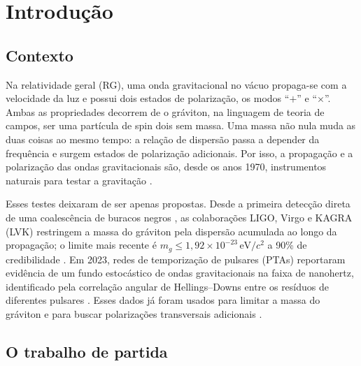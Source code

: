 \chapter{Introdução}
\label{cap:introducao}

\section{Contexto}

Na relatividade geral (RG), uma onda gravitacional no vácuo propaga-se
com a velocidade da luz e possui dois estados de polarização, os modos
``$+$'' e ``$\times$''. Ambas as propriedades decorrem de o gráviton,
na linguagem de teoria de campos, ser uma partícula de spin dois sem
massa. Uma massa não nula muda as duas coisas ao mesmo tempo: a relação
de dispersão passa a depender da frequência e surgem estados de
polarização adicionais. Por isso, a propagação e a polarização das ondas
gravitacionais são, desde os anos 1970, instrumentos naturais para testar
a gravitação \autocite{eardley1973,will2014}.

Esses testes deixaram de ser apenas propostas. Desde a primeira detecção
direta de uma coalescência de buracos negros \autocite{gw150914}, as
colaborações LIGO, Virgo e KAGRA (LVK) restringem a massa do gráviton
pela dispersão acumulada ao longo da propagação; o limite mais recente
é $m_g\leq1{,}92\times10^{-23}\,\mathrm{eV}/c^2$ a 90\% de credibilidade
\autocite{lvk2026}. Em 2023, redes de temporização de pulsares (PTAs)
reportaram evidência de um fundo estocástico de ondas gravitacionais na
faixa de nanohertz, identificado pela correlação angular de
Hellings--Downs entre os resíduos de diferentes pulsares
\autocite{agazie2023,hellings1983}. Esses dados já foram usados para
limitar a massa do gráviton \autocite{wu2024} e para buscar polarizações
transversais adicionais \autocite{nanograv2024}.

\section{O trabalho de partida}

